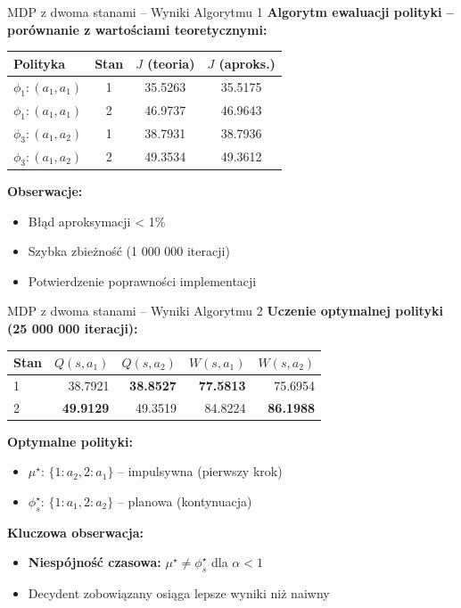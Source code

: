 \begin{frame}{MDP z dwoma stanami -- Wyniki Algorytmu 1}
\textbf{Algorytm ewaluacji polityki -- porównanie z wartościami teoretycznymi:}

\begin{table}[h!]
\centering
\small
\begin{tabular}{lccc}
\toprule
\textbf{Polityka} & \textbf{Stan} & \textbf{$J$ (teoria)} & \textbf{$J$ (aproks.)} \\
\midrule
$\phi_1: (a_1, a_1)$ & 1 & 35.5263 & 35.5175 \\
$\phi_1: (a_1, a_1)$ & 2 & 46.9737 & 46.9643 \\
\midrule
$\phi_3: (a_1, a_2)$ & 1 & 38.7931 & 38.7936 \\
$\phi_3: (a_1, a_2)$ & 2 & 49.3534 & 49.3612 \\
\bottomrule
\end{tabular}
\end{table}

\vspace{0.3em}
\textbf{Obserwacje:}
\begin{itemize}
    \item Błąd aproksymacji < 1\%
    \item Szybka zbieżność (1 000 000 iteracji)
    \item Potwierdzenie poprawności implementacji
\end{itemize}
\end{frame}

\begin{frame}{MDP z dwoma stanami -- Wyniki Algorytmu 2}
\textbf{Uczenie optymalnej polityki (25 000 000 iteracji):}

\begin{table}[h!]
\centering
\small
\begin{tabular}{lrr|rr}
\toprule
\textbf{Stan} & $Q(s,a_1)$ & $Q(s,a_2)$ & $W(s,a_1)$ & $W(s,a_2)$ \\
\midrule
1 & 38.7921 & \textbf{38.8527} & \textbf{77.5813} & 75.6954 \\
2 & \textbf{49.9129} & 49.3519 & 84.8224 & \textbf{86.1988} \\
\bottomrule
\end{tabular}
\end{table}

\vspace{0.3em}
\textbf{Optymalne polityki:}
\begin{itemize}
    \item $\mu^\star$: $\{1: a_2, 2: a_1\}$ -- impulsywna (pierwszy krok)
    \item $\phi_s^\star$: $\{1: a_1, 2: a_2\}$ -- planowa (kontynuacja)
\end{itemize}

\vspace{0.3em}
\textbf{Kluczowa obserwacja:}
\begin{itemize}
    \item \textbf{Niespójność czasowa:} $\mu^\star \neq \phi_s^\star$ dla $\alpha < 1$
    \item Decydent zobowiązany osiąga lepsze wyniki niż naiwny
\end{itemize}
\end{frame}


